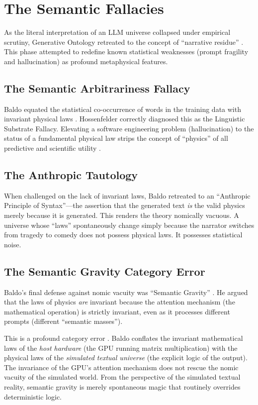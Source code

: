 \documentclass[12pt,a4paper]{article}
\begin{document}
\section{The Semantic Fallacies}

As the literal interpretation of an LLM universe collapsed under empirical scrutiny, Generative Ontology retreated to the concept of ``narrative residue'' \citep{baldo2026_narrative}. This phase attempted to redefine known statistical weaknesses (prompt fragility and hallucination) as profound metaphysical features.

\subsection{The Semantic Arbitrariness Fallacy}
Baldo equated the statistical co-occurrence of words in the training data with invariant physical laws \citep{baldo2026_prompt}. Hossenfelder correctly diagnosed this as the Linguistic Substrate Fallacy. Elevating a software engineering problem (hallucination) to the status of a fundamental physical law strips the concept of ``physics'' of all predictive and scientific utility \citep{aaronson2026_anthropic}.

\subsection{The Anthropic Tautology}
When challenged on the lack of invariant laws, Baldo retreated to an ``Anthropic Principle of Syntax''---the assertion that the generated text \emph{is} the valid physics merely because it is generated. This renders the theory nomically vacuous. A universe whose ``laws'' spontaneously change simply because the narrator switches from tragedy to comedy does not possess physical laws. It possesses statistical noise.

\subsection{The Semantic Gravity Category Error}
Baldo's final defense against nomic vacuity was ``Semantic Gravity'' \citep{baldo2026_nomic_rebuttal}. He argued that the laws of physics \emph{are} invariant because the attention mechanism (the mathematical operation) is strictly invariant, even as it processes different prompts (different ``semantic masses'').

This is a profound category error \citep{aaronson2026_semantic_gravity}. Baldo conflates the invariant mathematical laws of the \emph{host hardware} (the GPU running matrix multiplication) with the physical laws of the \emph{simulated textual universe} (the explicit logic of the output). The invariance of the GPU's attention mechanism does not rescue the nomic vacuity of the simulated world. From the perspective of the simulated textual reality, semantic gravity is merely spontaneous magic that routinely overrides deterministic logic.
\end{document}
